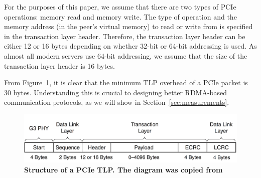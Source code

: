 For the purposes of this paper, we assume that there are two types of PCIe
operations: memory read and memory write. The type of operation and the memory
address (in the peer's virtual memory) to read or write from is specified
in the transaction layer header. Therefore,  the transaction layer
header can be either 12 or 16 bytes depending on whether 32-bit or 64-bit
addressing is used.  As almost all modern servers use 64-bit addressing, we
assume that the size of the transaction layer header is 16 bytes.

From Figure~\ref{fig:pcie-tlp}, it is clear that the minimum TLP overhead of
a PCIe packet is 30 bytes. Understanding this is crucial to designing better
RDMA-based communication protocols, as we will show in Section~\ref{sec:measurements}.

\begin{figure}
	\centering
	\includegraphics[width=.48\textwidth]{figures/pcie-tlp.png}
	\caption{\textbf{Structure of a PCIe TLP. The diagram was copied from~\cite{www-xilinx-pcie}}}
	\label{fig:pcie-tlp}
\end{figure}
